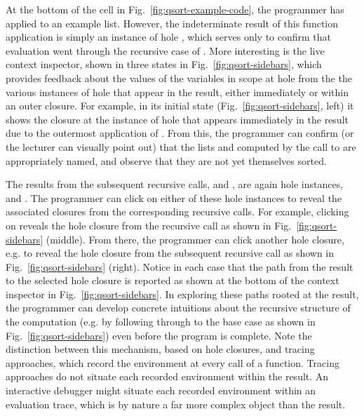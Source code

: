 At the bottom of the cell in Fig.~\ref{fig:qsort-example-code}, the programmer has applied  to an example list. However, 
the indeterminate result of this function application is simply an instance of hole , which serves only to confirm that evaluation went through the recursive case of . 
More interesting is the live context inspector, shown in three states in Fig.~\ref{fig:qsort-sidebars}, which provides feedback about the values of the variables in scope at hole  from the the various instances of hole  that appear in the result, either immediately or within an outer closure. For example, in its initial state (Fig.~\ref{fig:qsort-sidebars}, left) it shows the closure at the instance of hole  that appears immediately in the result due to the outermost application of . From this, the programmer can confirm (or the lecturer can visually point out) that 
the lists  and  computed by the call to  are appropriately named, and observe that they are not yet themselves sorted.

The results from the subsequent recursive calls,  and , are again hole instances,  and . 
The programmer can click on either of these hole instances to reveal the associated closures from the corresponding recursive calls. 
For example, clicking on  reveals the hole closure from the  recursive call as shown in Fig.~\ref{fig:qsort-sidebars} (middle). 
From there, the programmer can click another hole closure, e.g.  to reveal the hole closure from the subsequent  recursive call as shown in Fig.~\ref{fig:qsort-sidebars} (right). 
Notice in each case that the path from the result to the selected hole closure is reported as shown at the bottom of the context inspector in Fig.~\ref{fig:qsort-sidebars}. 
In exploring these paths rooted at the result, the programmer can develop concrete intuitions about the recursive structure of the computation (e.g. by following through to the base case as shown in Fig.~\ref{fig:qsort-sidebars}) even before the program is complete. 
Note the distinction between this mechanism, based on hole closures, and tracing approaches, which record the environment at every call of a function. 
Tracing approaches do not situate each 
recorded environment within the result. An interactive debugger might situate each recorded environment within an evaluation trace, which is by nature a far more complex object than the result. 

